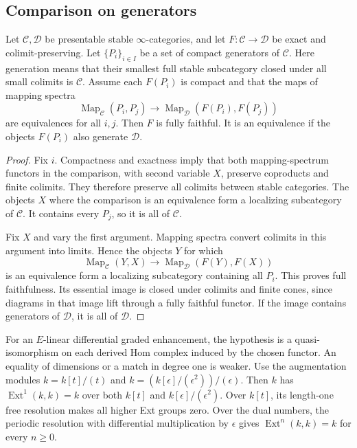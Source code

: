 \subsection{Comparison on generators}

\begin{theorem}
\label{v4-arith:ic:w5-e:local:generator-criterion}
Let $\mathcal C,\mathcal D$ be presentable stable
$\infty$-categories, and let $F:\mathcal C\to\mathcal D$ be exact
and colimit-preserving. Let $\{P_i\}_{i\in I}$ be a set of compact
generators of $\mathcal C$.
Here generation means that their smallest full stable subcategory
closed under all small colimits is $\mathcal C$.
Assume each $F(P_i)$ is compact and that the maps of mapping spectra
\[
 \operatorname{Map}_{\mathcal C}(P_i,P_j)
 \longrightarrow
 \operatorname{Map}_{\mathcal D}(F(P_i),F(P_j))
\]
are equivalences for all $i,j$. Then $F$ is fully faithful.
It is an equivalence if the objects $F(P_i)$ also generate
$\mathcal D$.
\end{theorem}

\begin{proof}
Fix $i$. Compactness and exactness imply that both mapping-spectrum
functors in the comparison, with second variable $X$, preserve
coproducts and finite colimits. They therefore preserve all colimits
between stable categories. The objects $X$ where the comparison is an
equivalence form a localizing subcategory of $\mathcal C$.
It contains every $P_j$, so it is all of $\mathcal C$.

Fix $X$ and vary the first argument. Mapping spectra convert colimits
in this argument into limits. Hence the objects $Y$ for which
\[
 \operatorname{Map}_{\mathcal C}(Y,X)
 \longrightarrow\operatorname{Map}_{\mathcal D}(F(Y),F(X))
\]
is an equivalence form a localizing subcategory containing all $P_i$.
This proves full faithfulness. Its essential image is closed under
colimits and finite cones, since diagrams in that image lift through
a fully faithful functor. If the image contains generators of
$\mathcal D$, it is all of $\mathcal D$.
\end{proof}

For an $E$-linear differential graded enhancement, the hypothesis is a
quasi-isomorphism on each derived Hom complex induced by the chosen
functor. An equality of dimensions or a match in degree one is weaker.
Use the augmentation modules $k=k[t]/(t)$ and
$k=(k[\epsilon]/(\epsilon^2))/(\epsilon)$. Then $k$ has
$\operatorname{Ext}^1(k,k)=k$ over both $k[t]$ and
$k[\epsilon]/(\epsilon^2)$. Over $k[t]$, its length-one free resolution
makes all higher Ext groups zero. Over the dual numbers, the periodic
resolution with differential multiplication by $\epsilon$ gives
$\operatorname{Ext}^n(k,k)=k$ for every $n\ge0$.

